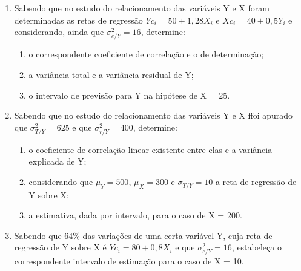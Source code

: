 \begin{enumerate}[resume]
\item Sabendo que no estudo do relacionamento das variáveis Y e X foram determinadas as retas de regressão $Yc_{i} = 50 + 1,28X_{i} $ e $Xc_{i} = 40 + 0,5Y_{i} $  e considerando, ainda que $\sigma^{2}_{e/Y} = 16 $, determine: 
	\begin{enumerate}
	\item o correspondente coeficiente de correlação e o de determinação;
	\item a variância total e a variância residual de Y;
	\item o intervalo de previsão para Y na hipótese de X = 25.
	\end{enumerate}
	
\item Sabendo que no estudo do relacionamento das variáveis Y e X ffoi apurado que $\sigma^{2}_{T/Y} = 625 $ e que $\sigma^{2}_{r/Y} = 400 $, determine: 
	\begin{enumerate}
	\item o coeficiente de correlação linear existente entre elas e a variância explicada de Y;
	\item considerando que $\mu_{Y} = 500$, $\mu_{X} = 300$ e $\sigma_{T/Y} = 10$ a reta de regressão de Y sobre X;
	\item a estimativa, dada por intervalo, para o caso de X = 200.
	\end{enumerate}	

\item Sabendo que $64\%$ das variações de uma certa variável Y, cuja reta de regressão de Y sobre X é $Yc_{i} = 80 + 0,8X_{i} $ e que $\sigma^{2}_{e/Y} = 16$, estabeleça o correspondente intervalo de estimação para o caso de X = 10.

\end{enumerate}
